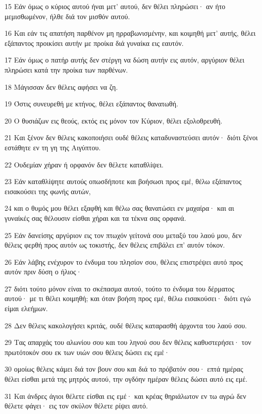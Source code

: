 \par 15 Εάν όμως ο κύριος αυτού ήναι μετ' αυτού, δεν θέλει πληρώσει· αν ήτο μεμισθωμένον, ήλθε διά τον μισθόν αυτού.
\par 16 Και εάν τις απατήση παρθένον μη ηρραβωνισμένην, και κοιμηθή μετ' αυτής, θέλει εξάπαντος προικίσει αυτήν με προίκα διά γυναίκα εις εαυτόν.
\par 17 Εάν όμως ο πατήρ αυτής δεν στέργη να δώση αυτήν εις αυτόν, αργύριον θέλει πληρώσει κατά την προίκα των παρθένων.
\par 18 Μάγισσαν δεν θέλεις αφήσει να ζη.
\par 19 Όστις συνευρεθή με κτήνος, θέλει εξάπαντος θανατωθή.
\par 20 Ο θυσιάζων εις θεούς, εκτός εις μόνον τον Κύριον, θέλει εξολοθρευθή.
\par 21 Και ξένον δεν θέλεις κακοποιήσει ουδέ θέλεις καταδυναστεύσει αυτόν· διότι ξένοι εστάθητε εν τη γη της Αιγύπτου.
\par 22 Ουδεμίαν χήραν ή ορφανόν δεν θέλετε καταθλίψει.
\par 23 Εάν καταθλίψητε αυτούς οπωσδήποτε και βοήσωσι προς εμέ, θέλω εξάπαντος εισακούσει της φωνής αυτών,
\par 24 και ο θυμός μου θέλει εξαφθή και θέλω σας θανατώσει εν μαχαίρα· και αι γυναίκές σας θέλουσιν είσθαι χήραι και τα τέκνα σας ορφανά.
\par 25 Εάν δανείσης αργύριον εις τον πτωχόν γείτονά σου μεταξύ του λαού μου, δεν θέλεις φερθή προς αυτόν ως τοκιστής, δεν θέλεις επιβάλει επ' αυτόν τόκον.
\par 26 Εάν λάβης ενέχυρον το ένδυμα του πλησίον σου, θέλεις επιστρέψει αυτό προς αυτόν πριν δύση ο ήλιος·
\par 27 διότι τούτο μόνον είναι το σκέπασμα αυτού, τούτο το ένδυμα του δέρματος αυτού· με τι θέλει κοιμηθή; και όταν βοήση προς εμέ, θέλω εισακούσει· διότι εγώ είμαι ελεήμων.
\par 28 Δεν θέλεις κακολογήσει κριτάς, ουδέ θέλεις καταρασθή άρχοντα του λαού σου.
\par 29 Τας απαρχάς του αλωνίου σου και του ληνού σου δεν θέλεις καθυστερήσει· τον πρωτότοκόν σου εκ των υιών σου θέλεις δώσει εις εμέ·
\par 30 ομοίως θέλεις κάμει διά τον βουν σου και διά το πρόβατόν σου· επτά ημέρας θέλει είσθαι μετά της μητρός αυτού, την ογδόην ημέραν θέλεις δώσει αυτό εις εμέ.
\par 31 Και άνδρες άγιοι θέλετε είσθαι εις εμέ· και κρέας θηριάλωτον εν τω αγρώ δεν θέλετε φάγει· εις τον σκύλον θέλετε ρίψει αυτό.

